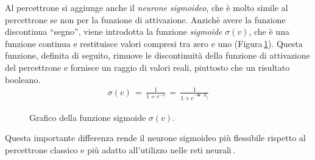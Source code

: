 Al percettrone si aggiunge anche il \textsl{neurone sigmoideo}, che è molto simile al percettrone se non per la funzione di attivazione. Anzichè avere la funzione discontinua ``segno'', viene introdotta la funzione \textsl{sigmoide} $\sigma(v)$, che è una funzione continua e restituisce valori compresi tra zero e uno (Figura\,\ref{fig:sigmoid-function}). Questa funzione, definita di seguito, rimuove le discontinuità della funzione di attivazione del percettrone e fornisce un raggio di valori reali, piuttosto che un risultato booleano.
% 
\begin{gather*}
    \sigma(v) \, = \, \frac{1}{1 + e^{-v}} \, = \, \frac{1}{1 + e^{-\mathbf{w} \cdot X_j}}
\end{gather*}
% 
\begin{figure}[!t]
    \centering
    
    \caption[Grafico della funzione sigmoide $\sigma(v)$.]{Grafico della funzione sigmoide $\sigma(v)$.}\label{fig:sigmoid-function}
\end{figure}
% 
Questa importante differenza rende il neurone sigmoideo più flessibile rispetto al percettrone classico e più adatto all'utilizzo nelle reti neurali\,\cite{nielsen2015neural}.

